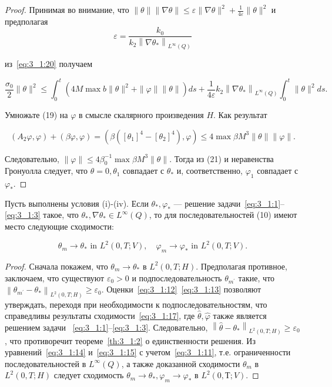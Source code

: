 \begin{proof}
Принимая во внимание, что
$\|\theta\|\|\nabla \theta\| \leq \varepsilon\|\nabla \theta\|^{2}+
\frac{1}{4 \varepsilon}\|\theta\|^{2}$
и предполагая
\[
    \varepsilon=\frac{k_{0}}{k_{2}\left\|\nabla \theta_{*}\right\|_{L^{\infty}(Q)}}
\]


из~\eqref{eq:3_1:20} получаем

\begin{equation}
    \label{eq:3_1:21}
    \frac{\sigma_{0}}{2}\|\theta\|^{2} \leq \int_{0}^{t}
    \left(4 M \max b\|\theta\|^{2}+\|\varphi\|\|\theta\|\right) d s
    +\frac{1}{4 \varepsilon} k_{2}\left\|\nabla \theta_{*}\right\|_{L^{\infty}(Q)}
    \int_{0}^{t}\|\theta\|^{2} d s.
\end{equation}


Умножьте (19) на $\varphi$ в смысле скалярного произведения $H$.
Как результат

\[
    \left(A_{2} \varphi, \varphi\right)+(\beta \varphi, \varphi)=
    \left(\beta\left(\left[\theta_{1}\right]^{4}-
    \left[\theta_{2}\right]^{4}\right), \varphi\right)
    \leq 4 \max \beta M^{3}\|\theta\|\|\varphi\|.
\]


Следовательно, $\|\varphi\| \leq 4 \beta_{0}^{-1} \max \beta M^{3}\|\theta\|$.
Тогда из (21) и неравенства Гронуолла следует, что $\theta=0, \theta_{1}$
совпадает с $\theta_{*}$ и, соответственно, $\varphi_{1}$ совпадает с $\varphi_{*}$.
\end{proof}



\begin{theorem}
    \label{th:3_1:3}
Пусть выполнены условия (i)-(iv).
Если $\theta_{*}, \varphi_{*}$ — решение задачи~\eqref{eq:3_1:1}--\eqref{eq:3_1:3}
    такое, что $\theta_{*}, \nabla \theta_{*} \in L^{\infty }(Q)$,
то для последовательностей (10) имеют место следующие сходимости:

\[
    \theta_{m} \rightarrow \theta_{*} \text { in } L^{2}(0, T ; V),
    \quad \varphi_{m} \rightarrow \varphi_{*} \text { in } L^{2}(0, T ; V).
\]
\end{theorem}

\begin{proof}

Сначала покажем, что $\theta_{m} \rightarrow \theta_{*}$ в $L^{2}(0, T ; H)$.
Предполагая противное, заключаем, что существуют $\varepsilon_{0}>0$
и подпоследовательность $\theta_{m^{\prime}}$ такие, что
$\left\|\theta_{m^{\prime}} -\theta_{*}\right\|_{L^{2}(0, T ; H)}
\geq \varepsilon_{0}$.
Оценки~\eqref{eq:3_1:12}~\eqref{eq:3_1:13} позволяют утверждать,
переходя при необходимости к подпоследовательностям,
что справедливы результаты сходимости~\eqref{eq:3_1:17},
где $\widehat{\theta}, \widehat{\varphi}$
также является решением задачи ~\eqref{eq:3_1:1}--\eqref{eq:3_1:3}.
Следовательно, $\left\|\widehat{\theta}-\theta_{*}\right\|_{L^{2}(0, T ; H)}
\geq \varepsilon_{0}$, что противоречит теореме~\ref{th:3_1:2} о единственности решения.
Из уравнений~\eqref{eq:3_1:14} и~\eqref{eq:3_1:15} с учетом~\eqref{eq:3_1:11},
т.е. ограниченности последовательностей в $L^{\infty}(Q)$,
а также доказанной сходимости $\theta_{m}$ в $L^{2}(0, T; H)$
следует сходимость $\theta_{m} \rightarrow \theta_{*}, \varphi_{m}
\rightarrow \varphi_{*}$ в $L^ {2}(0, Т; V)$.
\end{proof}
